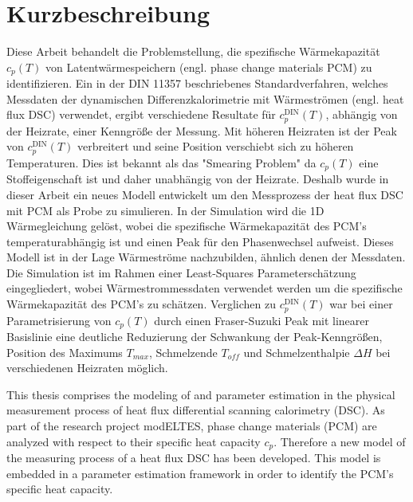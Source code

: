 \documentclass{scrartcl}[12pt, halfparskip]
\numberwithin{equation}{section}
\numberwithin{figure}{section}
\numberwithin{table}{section}
\begin{document}
\section*{Kurzbeschreibung}
Diese Arbeit behandelt die Problemstellung, die spezifische W\"armekapazit\"at $c_p(T)$ von Latentw\"armespeichern (engl. phase change materials PCM) zu identifizieren.
Ein in der DIN 11357 beschriebenes Standardverfahren, welches Messdaten der dynamischen Differenzkalorimetrie mit W\"armestr\"omen (engl. heat flux DSC) verwendet, ergibt verschiedene Resultate für $c_p^{\text{DIN}}(T)$, abh\"angig von der Heizrate, einer Kenngr\"oße der Messung. 
Mit h\"oheren Heizraten ist der Peak von $c_p^{\text{DIN}}(T)$ verbreitert und seine Position verschiebt sich zu h\"oheren Temperaturen. 
Dies ist bekannt als das "Smearing Problem" da $c_p(T)$ eine Stoffeigenschaft ist und daher unabhängig von der Heizrate.
Deshalb wurde in dieser Arbeit ein neues Modell entwickelt um den Messprozess der heat flux DSC mit PCM als Probe zu simulieren. 
In der Simulation wird die 1D Wärmegleichung gelöst, wobei die spezifische Wärmekapazität des PCM's temperaturabhängig ist und einen Peak für den Phasenwechsel aufweist. 
Dieses Modell ist in der Lage Wärmeströme nachzubilden, ähnlich denen der Messdaten. 
Die Simulation ist im Rahmen einer Least-Squares Parameterschätzung eingegliedert, wobei Wärmestrommessdaten verwendet werden um die spezifische Wärmekapazität des PCM's zu schätzen.  
Verglichen zu $c_p^{\text{DIN}}(T)$ war bei einer Parametrisierung von $c_p(T)$ durch einen Fraser-Suzuki Peak mit linearer Basislinie eine deutliche Reduzierung der Schwankung der Peak-Kenngrößen, Position des Maximums $T_{max}$, Schmelzende $T_{off}$ und Schmelzenthalpie $\Delta H$ bei verschiedenen Heizraten möglich. 


\newpage



\tableofcontents 
\newpage


This thesis comprises the modeling of and parameter estimation in the physical measurement process of heat flux differential scanning calorimetry (DSC). As part of the research project modELTES, phase change materials (PCM) are analyzed with respect to their specific heat capacity $c_p$. Therefore a new model of the measuring process of a heat flux DSC has been developed. This model is embedded in a parameter estimation framework in order to identify the PCM's specific heat capacity. \\
\end{document}
